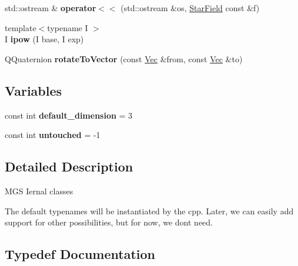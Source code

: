 \begin{DoxyCompactItemize}
\item 
\mbox{\label{namespacemgs_a4fcd3e4b13b1548fd4c5dcf4d478236d}} 
std\+::ostream \& {\bfseries operator$<$$<$} (std\+::ostream \&os, \hyperlink{namespacemgs_a7908010cda249b8bf1ea06572a4d4984}{Star\+Field} const \&f)
\item 
\mbox{\label{namespacemgs_a3a1417a093115c75a5809b917490a9c8}} 
{\footnotesize template$<$typename I $>$ }\\I {\bfseries ipow} (I base, I exp)
\item 
\mbox{\label{namespacemgs_a84f7ce8b66ad2e75f30a92d87659201d}} 
Q\+Quaternion {\bfseries rotate\+To\+Vector} (const \hyperlink{structmgs_1_1Vector}{Vec} \&from, const \hyperlink{structmgs_1_1Vector}{Vec} \&to)
\end{DoxyCompactItemize}
\subsection*{Variables}
\begin{DoxyCompactItemize}
\item 
\mbox{\label{namespacemgs_abd2b0e6d7ef99cf2e6fa0552a28bf491}} 
const int {\bfseries default\+\_\+dimension} = 3
\item 
\mbox{\label{namespacemgs_a0127e09449873e5509f1714c6ae0f6a9}} 
const int {\bfseries untouched} = -\/1
\end{DoxyCompactItemize}


\subsection{Detailed Description}
M\+GS Iernal classes

The default typenames will be instantiated by the cpp. Later, we can easily add support for other possibilities, but for now, we don\textquotesingle{}t need. 

\subsection{Typedef Documentation}
\mbox{\label{namespacemgs_a40c361242ea98fb1ff1241d06f7d5568}} 
